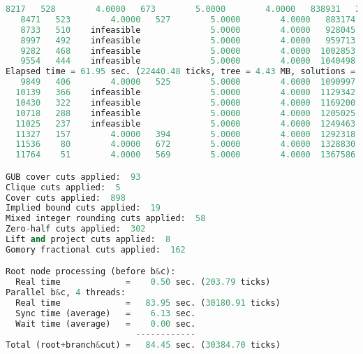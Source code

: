 \begin{lstlisting}[language=Python]
   8217   528        4.0000   673        5.0000        4.0000   838931   20.00%
   8471   523        4.0000   527        5.0000        4.0000   883174   20.00%
   8733   510    infeasible              5.0000        4.0000   928045   20.00%
   8997   492    infeasible              5.0000        4.0000   959713   20.00%
   9282   468    infeasible              5.0000        4.0000  1002853   20.00%
   9554   444    infeasible              5.0000        4.0000  1040498   20.00%
Elapsed time = 61.95 sec. (22440.48 ticks, tree = 4.43 MB, solutions = 1)
   9849   406        4.0000   525        5.0000        4.0000  1090997   20.00%
  10139   366    infeasible              5.0000        4.0000  1129342   20.00%
  10430   322    infeasible              5.0000        4.0000  1169200   20.00%
  10718   288    infeasible              5.0000        4.0000  1205025   20.00%
  11025   237    infeasible              5.0000        4.0000  1249463   20.00%
  11327   157        4.0000   394        5.0000        4.0000  1292318   20.00%
  11536    80        4.0000   672        5.0000        4.0000  1328830   20.00%
  11764    51        4.0000   569        5.0000        4.0000  1367586   20.00%

GUB cover cuts applied:  93
Clique cuts applied:  5
Cover cuts applied:  898
Implied bound cuts applied:  19
Mixed integer rounding cuts applied:  58
Zero-half cuts applied:  302
Lift and project cuts applied:  8
Gomory fractional cuts applied:  162

Root node processing (before b&c):
  Real time             =    0.50 sec. (203.79 ticks)
Parallel b&c, 4 threads:
  Real time             =   83.95 sec. (30180.91 ticks)
  Sync time (average)   =    6.13 sec.
  Wait time (average)   =    0.00 sec.
                          ------------
Total (root+branch&cut) =   84.45 sec. (30384.70 ticks)

\end{lstlisting}